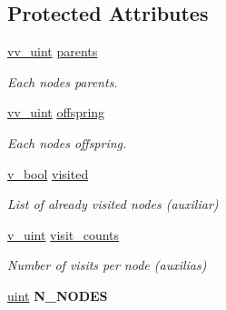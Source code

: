 \subsection*{Protected Attributes}
\begin{DoxyCompactItemize}
\item 
\hyperlink{typedefs_8h_a889a1eb698faf8cdf9160d65a20d316d}{vv\+\_\+uint} \hyperlink{classTree_a4d26e079c9d0b250a4bda27de8ad223c}{parents}\hypertarget{classTree_a4d26e079c9d0b250a4bda27de8ad223c}{}\label{classTree_a4d26e079c9d0b250a4bda27de8ad223c}

\begin{DoxyCompactList}\small\item\em Each nodes\textquotesingle{} parents. \end{DoxyCompactList}\item 
\hyperlink{typedefs_8h_a889a1eb698faf8cdf9160d65a20d316d}{vv\+\_\+uint} \hyperlink{classTree_ade5fd3ba5b6480c4edf8590eb0e41e34}{offspring}\hypertarget{classTree_ade5fd3ba5b6480c4edf8590eb0e41e34}{}\label{classTree_ade5fd3ba5b6480c4edf8590eb0e41e34}

\begin{DoxyCompactList}\small\item\em Each nodes\textquotesingle{} offspring. \end{DoxyCompactList}\item 
\hyperlink{typedefs_8h_a15a5deffe8bbc328d6b864316ab93cea}{v\+\_\+bool} \hyperlink{classTree_a45813764070bd88238a3372c16b423fa}{visited}\hypertarget{classTree_a45813764070bd88238a3372c16b423fa}{}\label{classTree_a45813764070bd88238a3372c16b423fa}

\begin{DoxyCompactList}\small\item\em List of already visited nodes (auxiliar) \end{DoxyCompactList}\item 
\hyperlink{typedefs_8h_ad56dde311aef1af823f4351451e8a381}{v\+\_\+uint} \hyperlink{classTree_ac504d0c090c1f76363fc00cff2de0e7f}{visit\+\_\+counts}\hypertarget{classTree_ac504d0c090c1f76363fc00cff2de0e7f}{}\label{classTree_ac504d0c090c1f76363fc00cff2de0e7f}

\begin{DoxyCompactList}\small\item\em Number of visits per node (auxilias) \end{DoxyCompactList}\item 
\hyperlink{typedefs_8h_a91ad9478d81a7aaf2593e8d9c3d06a14}{uint} {\bfseries N\+\_\+\+N\+O\+D\+ES}\hypertarget{classTree_a41b7a5ddd47b82688c099ee47561eb4f}{}\label{classTree_a41b7a5ddd47b82688c099ee47561eb4f}


\end{DoxyCompactItemize}
